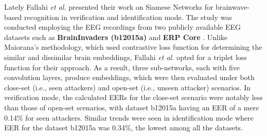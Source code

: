    Lately Fallahi \textit{et al.} \cite{fallahi2023brainnet} presented their work on Siamese Networks for brainwave-based recognition in verification and identification mode. The study was conducted employing the EEG recordings from two publicly available EEG datasets such as \textbf{BrainInvaders (b12015a)} \cite{brainInvaders15a} and \textbf{ERP Core} \cite{erpcore}. Unlike Maiorana's \cite{maiorana2019eeg} methodology, which used contrastive loss function for determining the similar and dissimilar brain embeddings, Fallahi \textit{et al.} opted for a triplet loss function for their approach. As a result, three sub-networks, each with five convolution layers, produce embeddings, which were then evaluated under both close-set (i.e., seen attackers) and open-set (i.e., unseen attacker) scenarios. In verification mode, the calculated EERs for the close-set scenario were notably less than those of open-set scenarios, with dataset b12015a having an EER of a mere 0.14$\%$ for seen attackers. Similar trends were seen in identification mode where EER for the dataset b12015a was 0.34$\%$, the lowest among all the datasets.            



